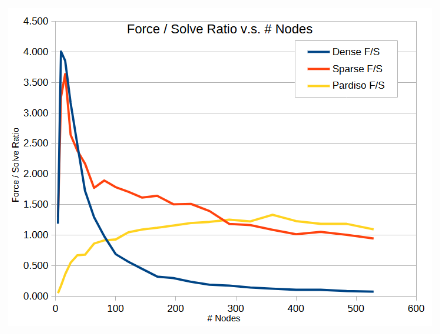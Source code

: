 \documentclass[letterpaper, 10 pt, conference]{ieeeconf}  %
\begin{document}
\begin{figure}
\begin{minipage}[b]{.45\linewidth}
\begin{center}
\begin{tabular}{|c|l|l|l|}
                                \end{tabular}
        \end{center}
         \label{fig:ratios}
        \end{minipage}\hfill
        \begin{minipage}[b]{.45\linewidth}
                \centering
                \includegraphics[width=1.0\linewidth]{ratios.png}
                 \label{fig:ratiosgraph}
        \end{minipage}
\end{figure}
\end{document}
